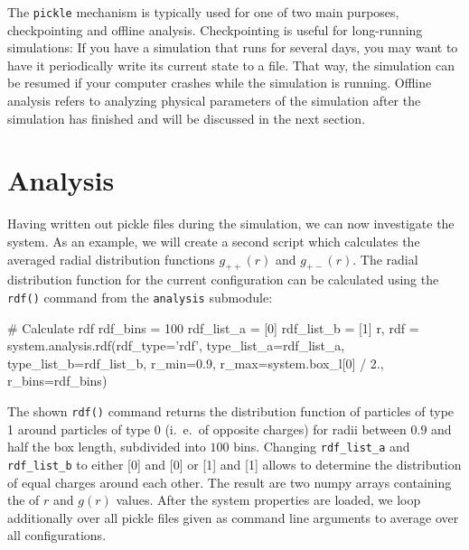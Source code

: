 \documentclass[
a4paper,                        %
11pt,                           %
twoside,                        %
footsepline,                    %
headsepline,                    %
headexclude,                    %
footexclude,                    %
pagesize,                       %
]{scrartcl}
\begin{document}
The \verb|pickle| mechanism is typically used for one of two main
purposes, checkpointing and offline analysis.
Checkpointing is useful for long-running simulations: If you have
a simulation that runs for several days, you may want to have it
periodically write its current state to a file. That way, the
simulation can be resumed if your computer crashes while the
simulation is running.
Offline analysis refers to analyzing physical parameters of the
simulation after the simulation has finished and will be discussed in
the next section.

\section{Analysis}

Having written out pickle files during the simulation, we can now
investigate the system. As an example, we will create a second script which 
calculates the averaged radial distribution functions $g_{++}(r)$ and 
$g_{+-}(r)$. The radial distribution function for the current 
configuration can be calculated using the \verb|rdf()| command from the 
\verb|analysis| submodule:

\begin{tclcode}
    # Calculate rdf
    rdf_bins = 100
    rdf_list_a = [0]
    rdf_list_b = [1]
    r, rdf = system.analysis.rdf(rdf_type='rdf', type_list_a=rdf_list_a,
                                 type_list_b=rdf_list_b, r_min=0.9,
                                 r_max=system.box_l[0] / 2., r_bins=rdf_bins)
\end{tclcode}


The shown \verb|rdf()| command returns the distribution function
of particles of type 1 around particles of type 0 (i.~e.\ of opposite
charges) for radii between $0.9$ and half the box length, subdivided
into $100$ bins.  Changing \verb|rdf_list_a| and \verb|rdf_list_b| to either 
[0] and [0] or [1] and [1] allows to determine the distribution of equal charges
around each other. The result are two numpy arrays containing the of $r$ and 
$g(r)$ values.
After the system properties are loaded, we loop additionally over all pickle 
files given as command line arguments to average over all configurations.
\end{document}
